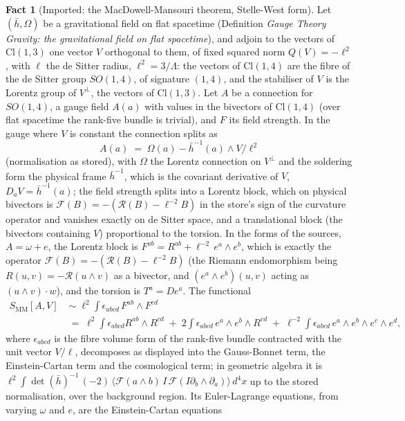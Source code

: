 \documentclass[11pt]{article}
\theoremstyle{definition}
\newtheorem{fact}[theorem]{Fact}
\theoremstyle{plain}
\newcommand{\changedmark}[2]{\marginpar{\raggedright\scriptsize\color{#1}#2}}
\providecommand{\Cl}{}\renewcommand{\Cl}{\mathrm{Cl}}
\providecommand{\hb}{}\renewcommand{\hb}{\bar{h}}
\begin{document}
\begin{fact}[Imported: the MacDowell-Mansouri theorem, Stelle-West form]\label{c:dark-energy.imported-macdowell-mansouri-theorem-stelle-west}
\changedmark{BurntOrange}{changed since the deposit}
Let $(\hb, \Omega)$ be a gravitational field on flat spacetime (Definition \emph{Gauge Theory Gravity: the gravitational field on flat spacetime}), and adjoin to the vectors of $\Cl(1,3)$ one vector $V$ orthogonal to them, of fixed squared norm $Q(V) = -\ell^2$, with $\ell$ the de Sitter radius, $\ell^2 = 3/\Lambda$: the vectors of $\Cl(1,4)$ are the fibre of the de Sitter group $SO(1,4)$, of signature $(1,4)$, and the stabiliser of $V$ is the Lorentz group of $V^\perp$, the vectors of $\Cl(1,3)$. Let $A$ be a connection for $SO(1,4)$, a gauge field $A(a)$ with values in the bivectors of $\Cl(1,4)$ (over flat spacetime the rank-five bundle is trivial), and $F$ its field strength. In the gauge where $V$ is constant the connection splits as
\[
A(a) \;=\; \Omega(a) - \hb^{-1}(a)\wedge V/\ell^{2}
\]
(normalisation as stored), with $\Omega$ the Lorentz connection on $V^\perp$ and the soldering form the physical frame $\hb^{-1}$, which is the covariant derivative of $V$, $D_a V = \hb^{-1}(a)$; the field strength splits into a Lorentz block, which on physical bivectors is $\mathcal{F}(B) = -(\mathcal{R}(B) - \ell^{-2}B)$ in the store's sign of the curvature operator and vanishes exactly on de Sitter space, and a translational block (the bivectors containing $V$) proportional to the torsion. In the forms of the sources, $A = \omega + e$, the Lorentz block is $F^{ab} = R^{ab} + \ell^{-2}\,e^a\wedge e^b$, which is exactly the operator $\mathcal{F}(B) = -(\mathcal{R}(B) - \ell^{-2}B)$ (the Riemann endomorphism being $R(u,v) = -\mathcal{R}(u \wedge v)$ as a bivector, and $(e^a \wedge e^b)(u,v)$ acting as $(u \wedge v) \cdot w$), and the torsion is $T^a = D e^a$. The functional
\[
\begin{aligned}
S_{\mathrm{MM}}[A, V] \;&\sim\; \ell^{2}\int \epsilon_{abcd}\,F^{ab}\wedge F^{cd}\\
&=\; \ell^{2}\!\int \epsilon_{abcd}R^{ab}\wedge R^{cd} \;+\; 2\!\int \epsilon_{abcd}\, e^a\wedge e^b\wedge R^{cd} \;+\; \ell^{-2}\!\int \epsilon_{abcd}\, e^a\wedge e^b\wedge e^c\wedge e^d ,
\end{aligned}
\]
where $\epsilon_{abcd}$ is the fibre volume form of the rank-five bundle contracted with the unit vector $V/\ell$, decomposes as displayed into the Gauss-Bonnet term, the Einstein-Cartan term and the cosmological term; in geometric algebra it is $\ell^{2}\int \det(\hb)^{-1}\,(-2)\,\langle\mathcal{F}(a \wedge b)\,I\,\mathcal{F}(I\partial_b \wedge \partial_a)\rangle\,d^{4}x$ up to the stored normalisation, over the background region. Its Euler-Lagrange equations, from varying $\omega$ and $e$, are the Einstein-Cartan equations

\end{fact}
\end{document}
